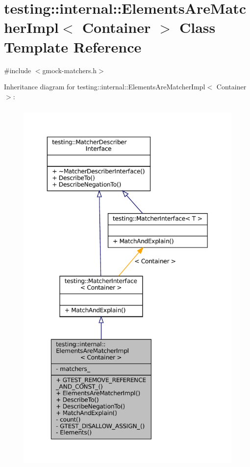 \hypertarget{classtesting_1_1internal_1_1ElementsAreMatcherImpl}{}\section{testing\+:\+:internal\+:\+:Elements\+Are\+Matcher\+Impl$<$ Container $>$ Class Template Reference}
\label{classtesting_1_1internal_1_1ElementsAreMatcherImpl}


{\ttfamily \#include $<$gmock-\/matchers.\+h$>$}



Inheritance diagram for testing\+:\+:internal\+:\+:Elements\+Are\+Matcher\+Impl$<$ Container $>$\+:
\nopagebreak
\begin{figure}[H]
\begin{center}
\leavevmode
\includegraphics[height=550pt]{classtesting_1_1internal_1_1ElementsAreMatcherImpl__inherit__graph}
\end{center}
\end{figure}


